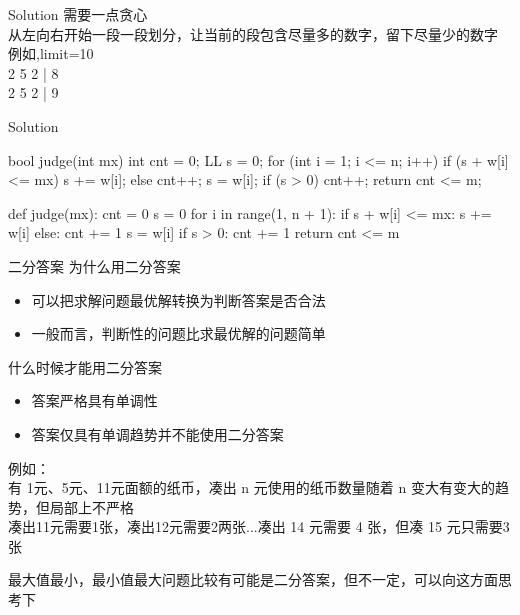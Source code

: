 \documentclass[aspectratio=169,xcolor=dvipsnames]{beamer}
\begin{document}
\begin{frame}[fragile]{Solution}
    需要一点贪心\\
    从左向右开始一段一段划分，让当前的段包含尽量多的数字，留下尽量少的数字\\
    例如,limit=10\\
    2 5 2 | 8\\
    2 5 2 | 9\\
\end{frame}
\begin{frame}[fragile]{Solution}
    \begin{minipage}{0.45\textwidth}
        \centering
        \begin{cppcode}
bool judge(int mx) {
    int cnt = 0;
    LL s = 0;
    for (int i = 1; i <= n; i++) {
        if (s + w[i] <= mx) {
            s += w[i];
        } else {
            cnt++;
            s = w[i];
        }
    }
    if (s > 0)
        cnt++;
    return cnt <= m;
}
        \end{cppcode}
    \end{minipage}%
    \hfill
    \begin{minipage}{0.45\textwidth}
        \centering
        \begin{pycode}
def judge(mx):
    cnt = 0
    s = 0
    for i in range(1, n + 1):
        if s + w[i] <= mx:
            s += w[i]
        else:
            cnt += 1
            s = w[i]
    if s > 0:
        cnt += 1
    return cnt <= m
        \end{pycode}
    \end{minipage}
\end{frame}

\begin{frame}{二分答案}
    为什么用二分答案
    \begin{itemize}
        \item 可以把求解问题最优解转换为判断答案是否合法
        \item 一般而言，判断性的问题比求最优解的问题简单
    \end{itemize}

    什么时候才能用二分答案
    \begin{itemize}
        \item 答案严格具有单调性
        \item 答案仅具有单调趋势并不能使用二分答案
    \end{itemize}
    例如： \\
    有 1元、5元、11元面额的纸币，凑出 n 元使用的纸币数量随着 n 变大有变大的趋势，但局部上不严格\\
    凑出11元需要1张，凑出12元需要2两张...凑出 14 元需要 4 张，但凑 15 元只需要3张

    \vspace*{2.5em}

    最大值最小，最小值最大问题比较有可能是二分答案，但不一定，可以向这方面思考下
\end{frame}
\end{document}
